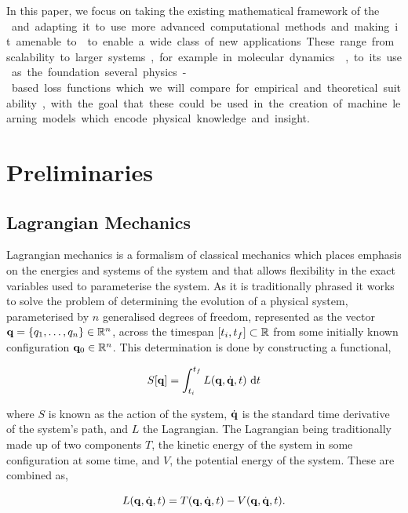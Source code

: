 In this paper, we focus on taking the existing mathematical framework of the \SI{} and adapting it to use more advanced computational methods and making it amenable to \autodiff{} to enable a wide class of new applications. These range from scalability to larger systems, for example in molecular dynamics, to its use as the foundation several physics-based loss functions which we will compare for empirical and theoretical suitability, with the goal that these could be used in the creation of machine learning models which encode physical knowledge and insight.

\section{Preliminaries}

\subsection{Lagrangian Mechanics}
\label{sec:lag-mech}

Lagrangian mechanics is a formalism of classical mechanics which places emphasis on the energies and systems of the system and that allows flexibility in the exact variables used to parameterise the system.
As it is traditionally phrased it works to solve the problem of determining the evolution of a physical system, parameterised by $n$ generalised degrees of freedom, represented as the vector $\vb q = \left\{q_1, \dots, q_n\right\} \in \mathbb{R}^n$, across the timespan $[t_i, t_f] \subset \mathbb{R}$ from some initially known configuration $\vb q_0 \in \mathbb{R}^n$. This determination is done by constructing a functional,

\begin{equation}
  \label{eq:trad-action}
  S[\vb{q}] = \int_{t_i}^{t_f} L(\vb{q}, \dot{\vb{q}}, t) ~\mathrm{d} t
\end{equation}

where $S$ is known as the action of the system, $\dot{\vb{q}}$ is the standard time derivative of the system's path, and $L$ the Lagrangian. The Lagrangian being traditionally made up of two components $T$, the kinetic energy of the system in some configuration at some time, and $V$, the potential energy of the system. These are combined as,

\begin{equation}
  \label{eq:trad-lag}
  L(\vb{q}, \dot{\vb{q}}, t) = T(\vb{q}, \dot{\vb{q}}, t) - V(\vb{q}, \dot{\vb{q}}, t).
\end{equation}

